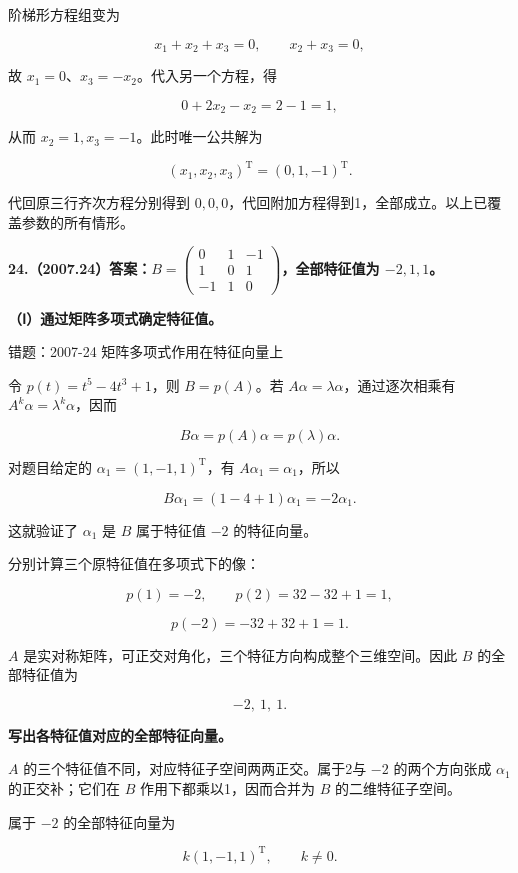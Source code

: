 \documentclass[UTF8,11pt,fontset=windows]{ctexart}
\begin{document}
阶梯形方程组变为

$$
x_1+x_2+x_3=0,\qquad x_2+x_3=0,
$$

故 $x_1=0$、$x_3=-x_2$。代入另一个方程，得

$$
0+2x_2-x_2=2-1=1,
$$

从而 $x_2=1,x_3=-1$。此时唯一公共解为

$$
\boxed{(x_1,x_2,x_3)^{\mathrm T}=(0,1,-1)^{\mathrm T}.}
$$

代回原三行齐次方程分别得到 $0,0,0$，代回附加方程得到1，全部成立。以上已覆盖参数的所有情形。

\clearpage

\textbf{24.（2007.24）答案：$B=\begin{pmatrix}0&1&-1\\1&0&1\\-1&1&0\end{pmatrix}$，全部特征值为 $-2,1,1$。}

\textbf{（Ⅰ）通过矩阵多项式确定特征值。}

\begingroup\color{gray}错题：2007-24 矩阵多项式作用在特征向量上\par\endgroup

令 $p(t)=t^5-4t^3+1$，则 $B=p(A)$。若 $A\alpha=\lambda\alpha$，通过逐次相乘有 $A^k\alpha=\lambda^k\alpha$，因而

$$
B\alpha=p(A)\alpha=p(\lambda)\alpha.
$$

对题目给定的 $\alpha_1=(1,-1,1)^{\mathrm T}$，有 $A\alpha_1=\alpha_1$，所以

$$
B\alpha_1=(1-4+1)\alpha_1=-2\alpha_1.
$$

这就验证了 $\alpha_1$ 是 $B$ 属于特征值 $-2$ 的特征向量。

分别计算三个原特征值在多项式下的像：

$$
p(1)=-2,\qquad p(2)=32-32+1=1,
$$

$$
p(-2)=-32+32+1=1.
$$

$A$ 是实对称矩阵，可正交对角化，三个特征方向构成整个三维空间。因此 $B$ 的全部特征值为

$$
\boxed{-2,\ 1,\ 1.}
$$

\textbf{写出各特征值对应的全部特征向量。}

$A$ 的三个特征值不同，对应特征子空间两两正交。属于2与 $-2$ 的两个方向张成 $\alpha_1$ 的正交补；它们在 $B$ 作用下都乘以1，因而合并为 $B$ 的二维特征子空间。

属于 $-2$ 的全部特征向量为

$$
\boxed{k(1,-1,1)^{\mathrm T},\qquad k\ne0.}
$$
\end{document}
